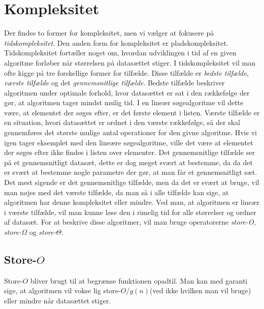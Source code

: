 \section{Kompleksitet} \label{kap:kompleksitet}

Der findes to former for kompleksitet, men vi vælger at fokusere på \emph{tidskompleksitet}. Den anden form for kompleksitet er pladskompleksitet. 
Tidskompleksitet fortæller noget om, hvordan udviklingen i tid af en given algoritme forløber når størrelsen på datasættet stiger. I tidskompleksitet vil man ofte kigge på tre forskellige former for tilfælde. Disse tilfælde er \emph{bedste tilfælde}, \emph{værste tilfælde} og det \emph{gennemsnitlige tilfælde}. 
Bedste tilfælde beskriver algoritmen under optimale forhold, hvor datasættet er sat i den rækkefølge der gør, at algoritmen tager mindst mulig tid. I en lineær søgealgoritme vil dette være, at elementet der søges efter, er det første element i listen. 
Værste tilfælde er en situation, hvori datasættet er ordnet i den værste rækkefølge, så der skal gennemføres det største mulige antal operationer for den givne algoritme. Hvis vi igen tager eksemplet med den lineære søgealgoritme, ville det være at elementet der søges efter ikke findes i listen over elementer.
Det gennemsnitlige tilfælde ser på et gennemsnitligt datasæt, dette er dog meget svært at bestemme, da da det er svært at bestemme nogle parametre der gør, at man får et gennemsnitligt sæt.
Det mest sigende er det gennemsnitlige tilfælde, men da det er svært at bruge, vil man nøjes med det værste tilfælde, da man så i alle tilfælde kan sige, at algoritmen har denne kompleksitet eller mindre. Ved man, at algoritmen er lineær i værste tilfælde, vil man kunne løse den i rimelig tid for alle størrelser og ordner af datasæt.
For at beskrive disse algoritmer, vil man bruge operatorerne \emph{store-O}, \emph{store-$\Omega$} og \emph{store-$\Theta$}. 


\subsection{Store-$O$}
Store-$O$ bliver brugt til at begrænse funktionen opadtil. Man kan med garanti sige, at algoritmen vil vokse lig store-$O$/$g(n)$(ved ikke hvilken man vil bruge) eller mindre når datasættet stiger.

